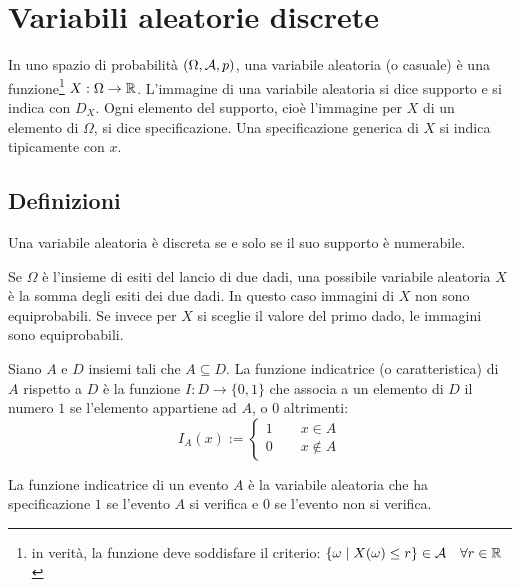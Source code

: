 \section{Variabili aleatorie discrete}
\begin{defin}
	In uno spazio di probabilità $(\Omega, \mathcal A, p)$, una variabile aleatoria (o casuale) è una funzione\footnote{in verità, la funzione deve soddisfare il criterio: $\{\omega \mid X(\omega)\leq r\}\in\mathcal A\quad\forall r\in\mathbb R$} $X:\Omega\to \mathbb R$.
	L'immagine di una variabile aleatoria si dice supporto e si indica con $D_X$. Ogni elemento del supporto, cioè l'immagine per $X$ di un elemento di $\Omega$, si dice specificazione. Una specificazione generica di $X$ si indica tipicamente con $x$.
\end{defin}


\subsection{Definizioni}
\begin{defin}
	Una variabile aleatoria è discreta se e solo se il suo supporto è numerabile.
\end{defin}

\begin{examp}
	Se $\Omega$ è l'insieme di esiti del lancio di due dadi, una possibile variabile aleatoria $X$ è la somma degli esiti dei due dadi. In questo caso immagini di $X$ non sono equiprobabili. Se invece per $X$ si sceglie il valore del primo dado, le immagini sono equiprobabili.
\end{examp}

\begin{defin}
	Siano $A$ e $D$ insiemi tali che $A\subseteq D$. La funzione indicatrice (o caratteristica) di $A$ rispetto a $D$ è la funzione $I:D\to \{0,1\}$ che associa a un elemento di $D$ il numero $1$ se l'elemento appartiene ad $A$, o $0$ altrimenti:
	\begin{equation*}
		I_A(x) := \begin{cases}
			1 \qquad x\in A \\
			0 \qquad x\notin A
		\end{cases}
	\end{equation*}
\end{defin}

\begin{defin} \label{def:findiceven}
	La funzione indicatrice di un evento $A$ è la variabile aleatoria che ha specificazione $1$ se l'evento $A$ si verifica e $0$ se l'evento non si verifica.
\end{defin}



